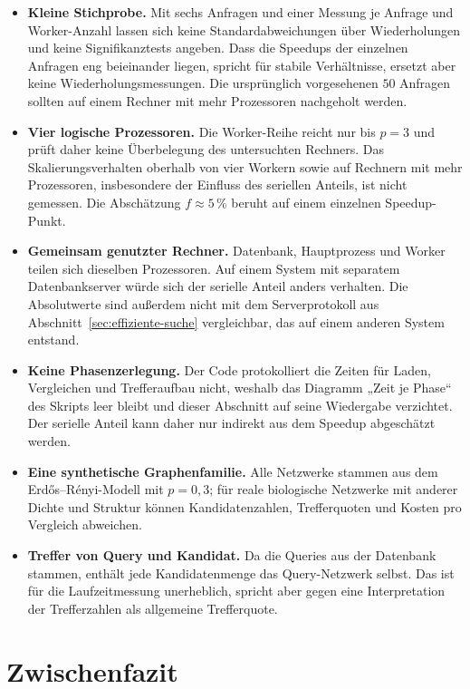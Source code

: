 \documentclass[a4paper,12pt, twoside]{report}
\theoremstyle{definition}
\begin{document}
\begin{itemize}
	\item \textbf{Kleine Stichprobe.} Mit sechs Anfragen und einer Messung je Anfrage und Worker-Anzahl lassen sich keine Standardabweichungen über Wiederholungen und keine Signifikanztests angeben. Dass die Speedups der einzelnen Anfragen eng beieinander liegen, spricht für stabile Verhältnisse, ersetzt aber keine Wiederholungsmessungen. Die ursprünglich vorgesehenen $50$ Anfragen sollten auf einem Rechner mit mehr Prozessoren nachgeholt werden.
	\item \textbf{Vier logische Prozessoren.} Die Worker-Reihe reicht nur bis $p=3$ und prüft daher keine Überbelegung des untersuchten Rechners. Das Skalierungsverhalten oberhalb von vier Workern sowie auf Rechnern mit mehr Prozessoren, insbesondere der Einfluss des seriellen Anteils, ist nicht gemessen. Die Abschätzung $f\approx 5\,\%$ beruht auf einem einzelnen Speedup-Punkt.
	\item \textbf{Gemeinsam genutzter Rechner.} Datenbank, Hauptprozess und Worker teilen sich dieselben Prozessoren. Auf einem System mit separatem Datenbankserver würde sich der serielle Anteil anders verhalten. Die Absolutwerte sind außerdem nicht mit dem Serverprotokoll aus Abschnitt~\ref{sec:effiziente-suche} vergleichbar, das auf einem anderen System entstand.
	\item \textbf{Keine Phasenzerlegung.} Der Code protokolliert die Zeiten für Laden, Vergleichen und Trefferaufbau nicht, weshalb das Diagramm „Zeit je Phase“ des Skripts leer bleibt und dieser Abschnitt auf seine Wiedergabe verzichtet. Der serielle Anteil kann daher nur indirekt aus dem Speedup abgeschätzt werden.
	\item \textbf{Eine synthetische Graphenfamilie.} Alle Netzwerke stammen aus dem Erdős–Rényi-Modell mit $p=0{,}3$; für reale biologische Netzwerke mit anderer Dichte und Struktur können Kandidatenzahlen, Trefferquoten und Kosten pro Vergleich abweichen.
	\item \textbf{Treffer von Query und Kandidat.} Da die Queries aus der Datenbank stammen, enthält jede Kandidatenmenge das Query-Netzwerk selbst. Das ist für die Laufzeitmessung unerheblich, spricht aber gegen eine Interpretation der Trefferzahlen als allgemeine Trefferquote.
\end{itemize}

\section{Zwischenfazit}
\end{document}
